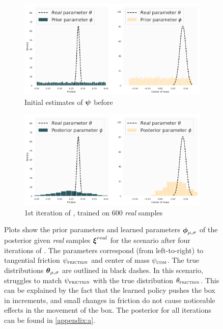 \begin{figure}
\centering
\captionsetup{size=footnotesize}
\begin{subfigure}{\textwidth}
  \includegraphics[width=\textwidth]{img/yumi/latent-representation/latent_encodings_iter0_style}%
  \caption{Initial estimates of $\boldsymbol{\psi}$ before \dettostoc{}}
\end{subfigure}
\begin{subfigure}{\textwidth}
  \centering
  \includegraphics[width=\linewidth]{img/yumi/latent-representation/latent_encodings_iter1_6_style}
  \caption{1st iteration of \dettostoc{}, trained on 600 \emph{real} samples}
\end{subfigure}
\caption{Plots show the prior parameters and learned parameters $\boldsymbol{\phi}_{\mu, \sigma}$ of the posterior given \emph{real} samples $\boldsymbol{\xi}^{real}{}$ for the \yp{} scenario after four iterations of \dettostoc{}. The parameters correspond (from left-to-right) to tangential friction $\psi_{\textsc{friction}}$ and center of mass $\psi_{\textsc{com}}$. The true distributions $\boldsymbol{\theta}_{\mu, \sigma}$ are outlined in black dashes. In this scenario, \dettostoc{} struggles to match $\psi_{\textsc{friction}}{}$ with the true distribution $\theta_\textsc{friction}$. This can be explained by the fact that the learned policy pushes the box in increments, and small changes in friction do not cause noticeable effects in the movement of the box. The posterior for all iterations can be found in \ref{appendix:a}.}
\label{fig:yumi_latent_space}
\end{figure}

